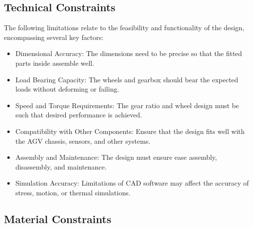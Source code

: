 \documentclass[../../main]{subfiles}
\begin{document}
\subsection{Technical Constraints}

The following limitations relate to the feasibility and functionality of the design, encompassing several key factors:

\begin{itemize}
  \item 
  Dimensional Accuracy: The dimensions need to be precise so that
  the fitted parts inside assemble well.
  
  \item 
  Load Bearing Capacity: The wheels and gearbox should bear the
  expected loads without deforming or failing.
  
  \item 
  Speed and Torque Requirements: The gear ratio and wheel design
  must be such that desired performance is achieved.
  
  \item 
  Compatibility with Other Components: Ensure that the design fits
  well with the AGV chassis, sensors, and other systems.
  
  \item 
  Assembly and Maintenance: The design must ensure ease assembly,
  disassembly, and maintenance.
  
  \item 
  Simulation Accuracy: Limitations of CAD software may affect the
  accuracy of stress, motion, or thermal simulations.
\end{itemize}

\subsection{Material Constraints}
\end{document}

